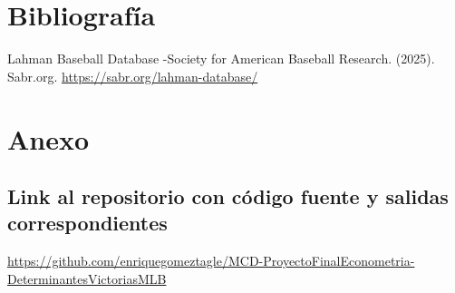 \documentclass[10pt]{article}
\begin{document}
\section{Bibliografía}
Lahman Baseball Database -Society for American Baseball Research. (2025). Sabr.org. \url{https://sabr.org/lahman-database/}
\section{Anexo}
\subsection{Link al repositorio con código fuente y salidas correspondientes}
\url{https://github.com/enriquegomeztagle/MCD-ProyectoFinalEconometria-DeterminantesVictoriasMLB}
\end{document}
